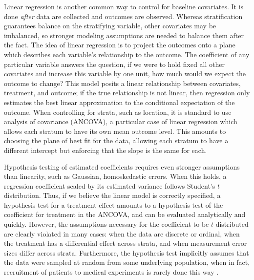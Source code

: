 \documentclass[11pt]{article}
\newcommand{\todo}[1]{{\color{red}{TO DO: \sc #1}}}
\begin{document}
Linear regression is another common way to control for baseline covariates.
It is done \textit{after} data are collected and outcomes are observed.
Whereas stratification guarantees balance on the stratifying variable, other covariates may be imbalanced, so stronger modeling assumptions are needed to balance them after the fact.
The idea of linear regression is to project the outcomes onto a plane which describes each variable's relationship to the outcome.
The coefficient of any particular variable answers the question, if we were to hold fixed all other covariates and increase this variable by one unit, how much would we expect the outcome to change?
This model posits a linear relationship between covariates, treatment, and outcome; 
if the true relationship is not linear, then regression only estimates the best linear approximation to the conditional expectation of the outcome.
When controlling for strata, such as location, it is standard to use analysis of covariance (ANCOVA), a particular case of linear regression which allows each stratum to have its own mean outcome level.
This amounts to choosing the plane of best fit for the data, allowing each stratum to have a different intercept but enforcing that the slope is the same for each.

Hypothesis testing of estimated coefficients requires even stronger assumptions than linearity, such as Gaussian, homoskedastic errors.
When this holds, a regression coefficient scaled by its estimated variance follows Student's $t$ distribution.
Thus, if we believe the linear model is correctly specified, a hypothesis test for a treatment effect amounts to a hypothesis test of the coefficient for treatment in the ANCOVA, and can be evaluated analytically and quickly.
However, the assumptions necessary for the coefficient to be $t$ distributed are clearly violated in many cases:
when the data are discrete or ordinal, when the treatment has a differential effect across strata, and when measurement error sizes differ across strata.
Furthermore, the hypothesis test implicitly assumes that the data were sampled at random from some underlying population, when in fact,
recruitment of patients to medical experiments is rarely done this way \todo{cite}.
\end{document}
